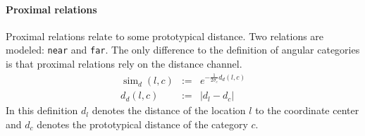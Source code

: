 \paragraph*{Proximal relations} 
Proximal relations relate to some prototypical
distance. Two relations are modeled: {\footnotesize\tt near} and 
{\footnotesize\tt far}. The only difference to the definition of angular
categories is that proximal relations rely on the distance channel.
\begin{eqnarray}
\label{e:proximal-category-similarity}
\operatorname{sim}_{d}(l,c)&:=&e^{-\frac{1}{2 \sigma_c} d_d(l,c)}\\
\label{e:proximal-distance}
d_d(l,c)&:=&|d_l-d_c|
\end{eqnarray}
In this definition $d_l$ denotes the distance of the location $l$ 
to the coordinate center and $d_c$ denotes the prototypical 
distance of the category $c$.

